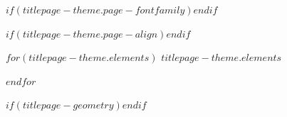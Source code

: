 \thispagestyle{empty}
$if(titlepage-theme.page-fontfamily)$\titlepagefont$endif$

\newlength{\minipagewidth}
\setlength{\minipagewidth}{\textwidth}

\raggedright
\begin{minipage}[b][\textheight][s]{\textwidth}
$if(titlepage-theme.page-align)$\titlepagepagealign$endif$
{\raggedleft\titlepageclassification\par}
$for(titlepage-theme.elements)$
$titlepage-theme.elements$

$endfor$
\par

\vfill
{\centering\small\textcolor{$if(titlepage-theme.classification-color)$$titlepage-theme.classification-color$$else$obsidianl$endif$}{\docref{}
  \ifdefempty{\obsidianedition}{}{\textbar{} \obsidianedition{}}
  \ifdefempty{\obsidianreview}{}{\textbar{} \obsidianreview{}}}\par}
\end{minipage}
\clearpage
$if(titlepage-geometry)$\restoregeometry$endif$
